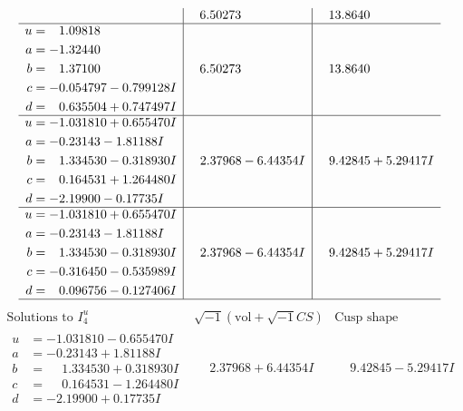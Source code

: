 \documentclass[1p]{elsarticle_modified}
\theoremstyle{definition}
\newcommand{\I}{\sqrt{-1}}
\begin{document}
$$\begin{array}{c|c|c}
 & \phantom{-}6.50273\phantom{ +0.000000I} & \phantom{-}13.8640\phantom{ +0.000000I} \\ \hline\begin{aligned}
u &= \phantom{-}1.09818\phantom{ +0.000000I} \\
a &= -1.32440\phantom{ +0.000000I} \\
b &= \phantom{-}1.37100\phantom{ +0.000000I} \\
c &= -0.054797 - 0.799128 I \\
d &= \phantom{-}0.635504 + 0.747497 I\end{aligned}
 & \phantom{-}6.50273\phantom{ +0.000000I} & \phantom{-}13.8640\phantom{ +0.000000I} \\ \hline\begin{aligned}
u &= -1.031810 + 0.655470 I \\
a &= -0.23143 - 1.81188 I \\
b &= \phantom{-}1.334530 - 0.318930 I \\
c &= \phantom{-}0.164531 + 1.264480 I \\
d &= -2.19900 - 0.17735 I\end{aligned}
 & \phantom{-}2.37968 - 6.44354 I & \phantom{-}9.42845 + 5.29417 I \\ \hline\begin{aligned}
u &= -1.031810 + 0.655470 I \\
a &= -0.23143 - 1.81188 I \\
b &= \phantom{-}1.334530 - 0.318930 I \\
c &= -0.316450 - 0.535989 I \\
d &= \phantom{-}0.096756 - 0.127406 I\end{aligned}
 & \phantom{-}2.37968 - 6.44354 I & \phantom{-}9.42845 + 5.29417 I\\
 \hline 
 \end{array}$$\newpage$$\begin{array}{c|c|c}  
\text{Solutions to }I^u_{4}& \I (\text{vol} + \sqrt{-1}CS) & \text{Cusp shape}\\
 \hline 
\begin{aligned}
u &= -1.031810 - 0.655470 I \\
a &= -0.23143 + 1.81188 I \\
b &= \phantom{-}1.334530 + 0.318930 I \\
c &= \phantom{-}0.164531 - 1.264480 I \\
d &= -2.19900 + 0.17735 I\end{aligned}
 & \phantom{-}2.37968 + 6.44354 I & \phantom{-}9.42845 - 5.29417 I \\ \hline\begin{aligned}

\end{aligned}
\end{array}$$
\end{document}
